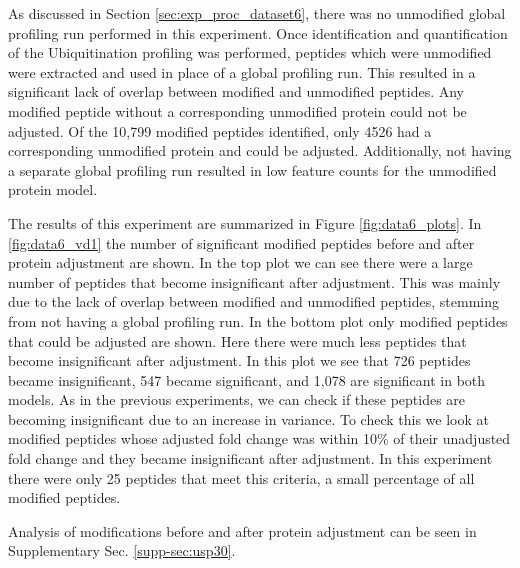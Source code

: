 \documentclass[mcp]{article}
\numberwithin{table}{section}
\begin{document}
As discussed in Section \ref{sec:exp_proc_dataset6}, there was no unmodified global profiling run performed in this experiment. Once identification and quantification of the Ubiquitination profiling was performed, peptides which were unmodified were extracted and used in place of a global profiling run. This resulted in a significant lack of overlap between modified and unmodified peptides. Any modified peptide without a corresponding unmodified protein could not be adjusted. Of the 10,799 modified peptides identified, only 4526 had a corresponding unmodified protein and could be adjusted. Additionally, not having a separate global profiling run resulted in low feature counts for the unmodified protein model.

The results of this experiment are summarized in Figure \ref{fig:data6_plots}. In \ref{fig:data6_vd1} the number of significant modified peptides before and after protein adjustment are shown. In the top plot we can see there were a large number of peptides that become insignificant after adjustment. This was mainly due to the lack of overlap between modified and unmodified peptides, stemming from not having a global profiling run. In the bottom plot only modified peptides that could be adjusted are shown. Here there were much less peptides that become insignificant after adjustment. In this plot we see that 726 peptides became insignificant, 547 became significant, and 1,078 are significant in both models. As in the previous experiments, we can check if these peptides are becoming insignificant due to an increase in variance. To check this we look at modified peptides whose adjusted fold change was within 10\% of their unadjusted fold change and they became insignificant after adjustment. In this experiment there were only 25 peptides that meet this criteria, a small percentage of all modified peptides.

Analysis of modifications before and after protein adjustment can be seen in Supplementary Sec. \ref{supp-sec:usp30}.

\end{document}
